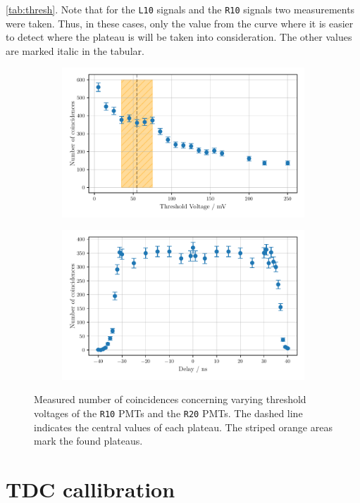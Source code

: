 \autoref{tab:thresh}.
Note that for the \texttt{L10} signals and the \texttt{R10} signals two measurements 
were taken. Thus, in these cases, only the value from the curve where it is easier to detect
where the plateau is will be taken into consideration.
The other values are marked italic in the tabular.
\begin{figure}
    \centering
    \begin{subfigure}[b]{0.48\textwidth}
    \includegraphics[width=\textwidth]{plots/threshR20.pdf}
\end{subfigure}\hfill
\begin{subfigure}[b]{0.48\textwidth}
    \includegraphics[width=\textwidth]{plots/threshR10.pdf}
\end{subfigure}
\caption{Measured number of coincidences concerning varying threshold voltages
of the \texttt{R10} PMTs and the \texttt{R20} PMTs.
The dashed line indicates the central values of each plateau. The striped orange areas mark the found plateaus.}
\label{fig:threshR10R20}
\end{figure}
\section{TDC callibration}
